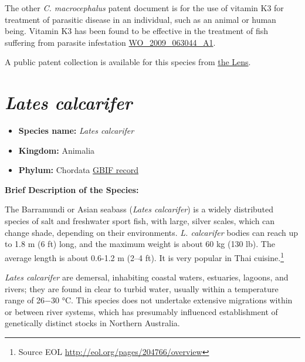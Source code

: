 \documentclass[]{book}
\providecommand{\tightlist}{%
  \setlength{\itemsep}{0pt}\setlength{\parskip}{0pt}}
\theoremstyle{definition}
\theoremstyle{definition}
\theoremstyle{definition}
\theoremstyle{remark}
\begin{document}
The other \emph{C. macrocephalus} patent document is for the use of
vitamin K3 for treatment of parasitic disease in an individual, such as
an animal or human being. Vitamin K3 has been found to be effective in
the treatment of fish suffering from parasite infestation
\href{https://www.lens.org/lens/patent/WO_2009_063044_A1}{WO\_2009\_063044\_A1}.

A public patent collection is available for this species from
\href{https://www.lens.org/lens/collection/24937}{the Lens}.

\hypertarget{lates-calcarifer}{%
\section{\texorpdfstring{\emph{Lates
calcarifer}}{Lates calcarifer}}\label{lates-calcarifer}}

\begin{itemize}
\tightlist
\item
  \textbf{Species name:} \emph{Lates calcarifer}
\item
  \textbf{Kingdom:} Animalia
\item
  \textbf{Phylum:} Chordata
  \href{https://www.gbif.org/species/2223871}{GBIF record}
\end{itemize}

\textbf{Brief Description of the Species:}

The Barramundi or Asian seabass (\emph{Lates calcarifer}) is a widely
distributed species of salt and freshwater sport fish, with large,
silver scales, which can change shade, depending on their environments.
\emph{L. calcarifer} bodies can reach up to 1.8 m (6 ft) long, and the
maximum weight is about 60 kg (130 lb). The average length is about
0.6-1.2 m (2--4 ft). It is very popular in Thai cuisine.\footnote{Source
  EOL \url{http://eol.org/pages/204766/overview}}

\emph{Lates calcarifer} are demersal, inhabiting coastal waters,
estuaries, lagoons, and rivers; they are found in clear to turbid water,
usually within a temperature range of 26−30 °C. This species does not
undertake extensive migrations within or between river systems, which
has presumably influenced establishment of genetically distinct stocks
in Northern Australia.
\end{document}
